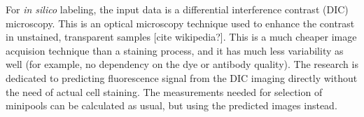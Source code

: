 For \textit{in silico} labeling, the input data is a differential interference contrast (DIC) microscopy. This is an optical microscopy technique used to enhance the contrast in unstained, transparent samples [cite wikipedia?]. This is a much cheaper image acquision technique than a staining process, and it has much less variability as well (for example, no dependency on the dye or antibody quality). The research is dedicated to predicting fluorescence signal from the DIC imaging directly without the need of actual cell staining. The measurements needed for selection of minipools can be calculated as usual, but using the predicted images instead.
